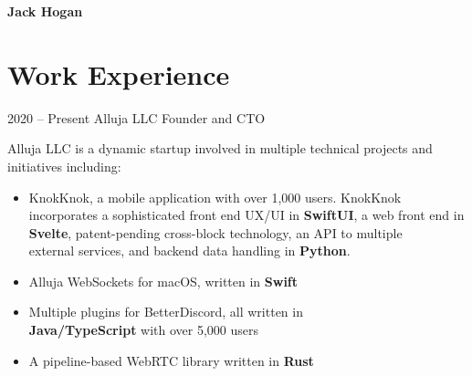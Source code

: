 \documentclass[
	10pt, %
]{FreemanCV}
\begin{document}
\begin{paracol}{2} %



\parbox[][0.11\textheight][c]{\linewidth}{ %

	{\sffamily\Huge \textbf{Jack Hogan}} %



}


\section{Work Experience}





\jobentry
	{2020 -- Present} %
	{} %
	{Alluja LLC} %
	{Founder and CTO} %
	{Alluja LLC is a dynamic startup involved in multiple technical projects and initiatives including:\begin{itemize}
		\item KnokKnok, a mobile application with over 1,000 users. KnokKnok\\ incorporates a sophisticated front end UX/UI in \textbf{SwiftUI}, a web front end in \textbf{Svelte}, patent-pending cross-block technology, an API to multiple\\ external services, and backend data handling in \textbf{Python}.
		\item Alluja WebSockets for macOS, written in \textbf{Swift}
		\item Multiple plugins for BetterDiscord, all written in \\\textbf{Java/TypeScript} with over 5,000 users
		\item A pipeline-based WebRTC library written in \textbf{Rust}
	\end{itemize}} %


\end{paracol}
\end{document}
